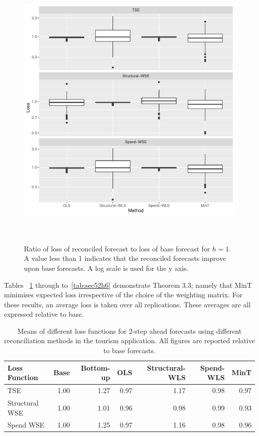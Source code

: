 \documentclass[12pt]{article}
\begin{document}
  	\begin{figure}[!hbt]
	\centering
	\small
	\includegraphics[width = \textwidth, height=14cm]{lossboxplots_6.pdf}
	\caption{ Ratio of loss of reconciled forecast to loss of base forecast for $h = 1$. A value less than 1 indicates that the reconciled forecasts improve upon base forecasts.  A log scale is used for the y axis.}
	\label{fig:BaseVSRecon_Fch6}
\end{figure}
  	
  	Tables ~\ref{tab:sec52h2} through to~\ref{tab:sec52h6} demonstrate Theorem 3.3; namely that MinT minimises expected loss irrespective of the choice of the weighting matrix.  For these results, an average loss is taken over all replications.  These averages are all expressed relative to base.  
  	
  	
  	\begin{table}[ht]
  		\centering
  		\begin{tabular}{lrrrrrr}
  			\hline
  			Loss Function & Base & Bottom-up & OLS & Structural-WLS & Spend-WLS & MinT \\ 
  			\hline
  			TSE & 1.00 & 1.27 & 0.97 & 1.17 & 0.98 & 0.97 \\ 
  			Structural WSE & 1.00 & 1.01 & 0.96 & 0.98 & 0.99 & 0.93 \\ 
  			Spend WSE & 1.00 & 1.25 & 0.97 & 1.16 & 0.98 & 0.96 \\ 
  			\hline
  		\end{tabular}
  		\caption{Means of different loss functions for 2-step ahead forecasts using different reconciliation methods in the tourism application.  All figures are reported relative to base forecasts.}
  		\label{tab:sec52h2} 
  	\end{table}
  	
\end{document}

